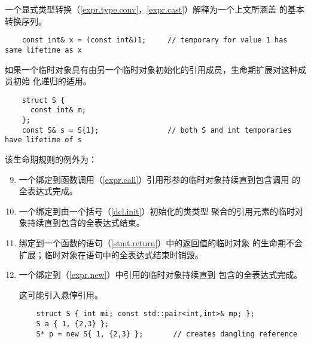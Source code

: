 \begin{note}
  一个显式类型转换（\ref{expr.type.conv}，\ref{expr.cast}）解释为一个上文所涵盖
  的基本转换序列。

  \begin{example}
    \begin{lstlisting}
    const int& x = (const int&)1;     // temporary for value 1 has same lifetime as x
    \end{lstlisting}
  \end{example}

\end{note}

\begin{note}
  如果一个临时对象具有由另一个临时对象初始化的引用成员，生命期扩展对这种成员初始
  化递归的适用。

  \begin{example}
    \begin{lstlisting}
    struct S {
      const int& m;
    };
    const S& s = S{1};                // both S and int temporaries have lifetime of s
    \end{lstlisting}
  \end{example}

\end{note}

该生命期规则的例外为：
\begin{enumerate}
  \setcounter{enumi}{8}
  \item 一个绑定到函数调用（\ref{expr.call}）引用形参的临时对象持续直到包含调用
        的全表达式完成。
  \item 一个绑定到由一个括号（\ref{dcl.init}）初始化的类类型
        聚合的引用元素的临时对象持续直到包含的全表达式结束。
  \item 绑定到一个函数的语句（\ref{stmt.return}）中的返回值的临时对象
        的生命期不会扩展；临时对象在语句中的全表达式结束时销毁。
  \item 一个绑定到（\ref{expr.new}）中引用的临时对象持续直到
        包含的全表达式完成。

        \begin{note}
          这可能引入悬停引用。
        \end{note}

        \begin{example}
            \begin{lstlisting}
    struct S { int mi; const std::pair<int,int>& mp; };
    S a { 1, {2,3} };
    S* p = new S{ 1, {2,3} };       // creates dangling reference
          \end{lstlisting}
        \end{example}
\end{enumerate}

